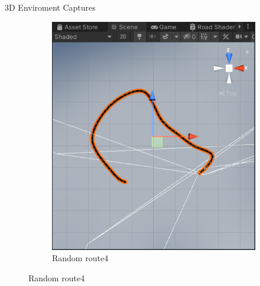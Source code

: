 \documentclass[final]{beamer}
\newlength{\onecolwid}
\newlength{\twocolwid}
\begin{document}
\begin{frame}[t]
\begin{columns}[t]
\begin{column}{\twocolwid}
\begin{alertblock}{3D Enviroment Captures}
\begin{figure}
\begin{subfigure}[bH]{0.15\textwidth}
        \includegraphics[width=\textwidth]{road4.PNG}
        \caption{Random route4}
        \label{fig:rr4}
    \end{subfigure}
       \label{fig:unity}
\end{figure}

\end{alertblock} 


\begin{columns}[t,totalwidth=\twocolwid] %

\begin{column}{\onecolwid} %



\end{column}
\end{columns}
\end{column}
\end{columns}
\end{frame}
\end{document}
